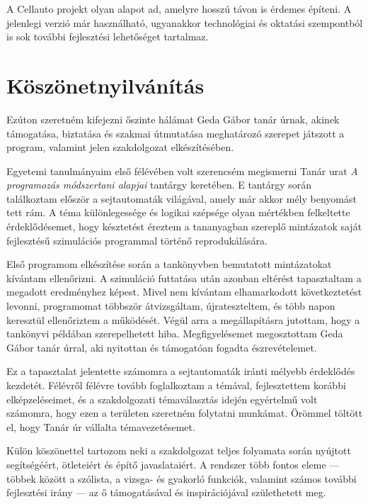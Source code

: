 \documentclass{thesis-ekf}
\begin{document}
A Cellauto projekt olyan alapot ad, amelyre hosszú távon is érdemes építeni. A jelenlegi verzió már használható, ugyanakkor technológiai és oktatási szempontból is sok további fejlesztési lehetőséget tartalmaz.

\chapter*{Köszönetnyilvánítás}

Ezúton szeretném kifejezni őszinte hálámat Geda Gábor tanár úrnak, akinek támogatása, biztatása és szakmai útmutatása meghatározó szerepet játszott a program, valamint jelen szakdolgozat elkészítésében.

Egyetemi tanulmányaim első félévében volt szerencsém megismerni Tanár urat \emph{A programozás módszertani alapjai} tantárgy keretében. E tantárgy során találkoztam először a sejtautomaták világával, amely már akkor mély benyomást tett rám. A téma különlegessége és logikai szépsége olyan mértékben felkeltette érdeklődésemet, hogy késztetést éreztem a tananyagban szereplő mintázatok saját fejlesztésű szimulációs programmal történő reprodukálására.

Első programom elkészítése során a tankönyvben bemutatott mintázatokat kívántam ellenőrizni. A szimuláció futtatása után azonban eltérést tapasztaltam a megadott eredményhez képest. Mivel nem kívántam elhamarkodott következtetést levonni, programomat többször átvizsgáltam, újrateszteltem, és több napon keresztül ellenőriztem a működését. Végül arra a megállapításra jutottam, hogy a tankönyvi példában szerepelhetett hiba. Megfigyelésemet megosztottam Geda Gábor tanár úrral, aki nyitottan és támogatóan fogadta észrevételemet.

Ez a tapasztalat jelentette számomra a sejtautomaták iránti mélyebb érdeklődés kezdetét. Félévről félévre tovább foglalkoztam a témával, fejlesztettem korábbi elképzeléseimet, és a szakdolgozati témaválasztás idején egyértelmű volt számomra, hogy ezen a területen szeretném folytatni munkámat. Örömmel töltött el, hogy Tanár úr vállalta témavezetésemet.

Külön köszönettel tartozom neki a szakdolgozat teljes folyamata során nyújtott segítségéért, ötleteiért és építő javaslataiért. A rendszer több fontos eleme --- többek között a szólista, a vizsga- és gyakorló funkciók, valamint számos további fejlesztési irány --- az ő támogatásával és inspirációjával születhetett meg.
\end{document}
